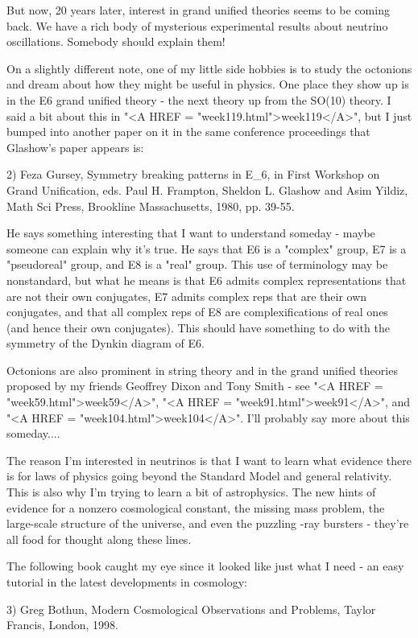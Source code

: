 But now, 20 years later, interest in grand unified theories seems
to be coming back.  We have a rich body of mysterious experimental
results about neutrino oscillations.  Somebody should explain them!

On a slightly different note, one of my little side hobbies is to study
the octonions and dream about how they might be useful in physics.  One
place they show up is in the E6 grand unified theory - the next theory
up from the SO(10) theory.  I said a bit about this in "<A HREF =
"week119.html">week119</A>", but I just bumped into another paper
on it in the same conference proceedings that Glashow's paper appears
is:

2) Feza Gursey, Symmetry breaking patterns in E_6, in First Workshop on
Grand Unification, eds. Paul H. Frampton, Sheldon L. Glashow and Asim
Yildiz, Math Sci Press, Brookline Massachusetts, 1980, pp. 39-55.

He says something interesting that I want to understand someday - maybe
someone can explain why it's true.  He says that E6 is a "complex"
group, E7 is a "pseudoreal" group, and E8 is a
"real" group.  This use of terminology may be nonstandard, but
what he means is that E6 admits complex representations that are not
their own conjugates, E7 admits complex reps that are their own
conjugates, and that all complex reps of E8 are complexifications of
real ones (and hence their own conjugates).  This should have something
to do with the symmetry of the Dynkin diagram of E6.

Octonions are also prominent in string theory and in the grand unified
theories proposed by my friends Geoffrey Dixon and Tony Smith - see
"<A HREF = "week59.html">week59</A>", "<A HREF =
"week91.html">week91</A>", and "<A HREF =
"week104.html">week104</A>".  I'll probably say more about this
someday....

The reason I'm interested in neutrinos is that I want to learn what
evidence there is for laws of physics going beyond the Standard Model
and general relativity.  This is also why I'm trying to learn a bit of
astrophysics.  The new hints of evidence for a nonzero cosmological
constant, the missing mass problem, the large-scale structure of the
universe, and even the puzzling \gamma -ray bursters - they're all food
for thought along these lines.  

The following book caught my eye since it looked like just what I 
need - an easy tutorial in the latest developments in cosmology:

3) Greg Bothun, Modern Cosmological Observations and Problems, Taylor \text{\&} 
Francis, London, 1998.

